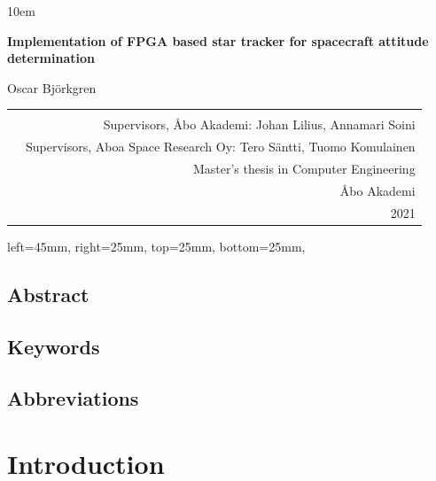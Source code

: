 \documentclass[12pt]{report}
\begin{document}
\emergencystretch 10em
\begin{titlepage}
\begin{center}
        \vspace*{5cm}
        
        \LARGE
        \textbf{Implementation of FPGA based star tracker for spacecraft attitude determination}
        \\
        \vspace{0.5cm}
        
        Oscar Björkgren
        
\end{center}
\vspace{8cm}
\begin{tabular}{l r }
\multirow{4}{10em}{
} \\
\multirow{12}{1em}{
} &

Supervisors, Åbo Akademi: Johan Lilius, Annamari Soini\\ &
Supervisors, Aboa Space Research Oy: Tero Säntti, Tuomo Komulainen\\ & 
Master's thesis in Computer Engineering\\ &
Åbo Akademi\\ &
2021

\end{tabular}

\flushright
\end{titlepage}
\newgeometry
{
 left=45mm,
 right=25mm,
 top=25mm,
 bottom=25mm,
}
\section*{Abstract}
\section*{Keywords}
\section*{Abbreviations}

\tableofcontents
\listoffigures

\chapter{Introduction}
\end{document}
